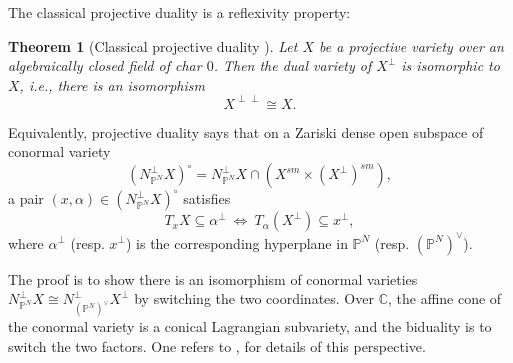 \documentclass[12pt]{amsart}
\newcommand{\C}{\mathbb{C}} %
\newtheorem{theorem}{Theorem}[section]
\begin{document}
The classical projective duality is a reflexivity property:
\begin{theorem}[Classical projective duality \cite{Kle86}] \label{thm_classicalPD}
Let $X$ be a projective variety over an algebraically closed field of char $0$. Then the dual variety of $X^{\perp}$ is isomorphic to $X$, i.e., there is an isomorphism
    $$X^{\perp\perp}\cong X.$$
\end{theorem}

Equivalently, projective duality says that on a Zariski dense open subspace of conormal variety 
$$(N_{\mathbb P^N}^{\perp}X)^{\circ}=N_{\mathbb P^N}^{\perp}X\cap (X^{sm}\times (X^{\perp})^{sm}),$$
a pair  $(x,\alpha)\in (N_{\mathbb P^N}^{\perp}X)^{\circ}$ satisfies 
\begin{equation}\label{eqn_classical-proj-dual}
    T_xX\subseteq \alpha^{\perp}\ \Longleftrightarrow\ T_\alpha(X^{\perp})\subseteq x^{\perp},
\end{equation}
where $\alpha^{\perp}$ (resp. $x^{\perp}$) is the corresponding hyperplane in $\mathbb P^{N}$ (resp. $(\mathbb P^{N})^{\vee}$).


The proof is to show there is an isomorphism of conormal varieties $N_{\mathbb P^N}^{\perp}X\cong N_{(\mathbb P^N)^{\vee}}^{\perp}X^{\perp}$ by switching the two coordinates. Over $\C$, the affine cone of the conormal variety is a conical Lagrangian subvariety, and the biduality is to switch the two factors. One refers to \cite[Section 1.3]{Tev05}, \cite{GKZ08} for details of this perspective.
\end{document}
